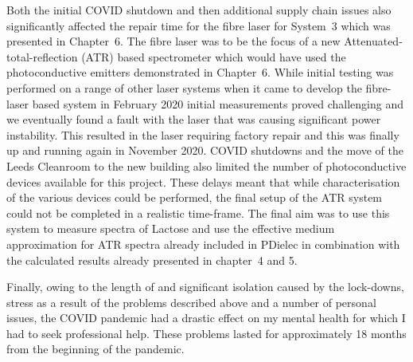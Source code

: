 Both the initial COVID shutdown and then additional supply chain issues also significantly affected the repair time for the fibre laser for System~3 which was presented in Chapter~6. The fibre laser was to be the focus of a new Attenuated-total-reflection (ATR) based spectrometer which would have used the photoconductive emitters demonstrated in Chapter~6. While initial testing was performed on a range of other laser systems when it came to develop the fibre-laser based system in February 2020 initial measurements proved challenging and we eventually found a fault with the laser that was causing significant power instability. This resulted in the laser requiring factory repair and this was finally up and running again in November 2020. COVID shutdowns and the move of the Leeds Cleanroom to the new building also limited the number of photoconductive devices available for this project. These delays meant that while characterisation of the various devices could be performed, the final setup of the ATR system could not be completed in a realistic time-frame. The final aim was to use this system to measure spectra of Lactose and use the effective medium approximation for ATR spectra already included in PDielec in combination with the calculated results already presented in chapter~4 and 5. 

Finally, owing to the length of and significant isolation caused by the lock\nobreakdash-downs, stress as a result of the problems described above and a number of personal issues, the COVID pandemic had a drastic effect on my mental health for which I had to seek professional help. These problems lasted for approximately 18 months from the beginning of the pandemic.